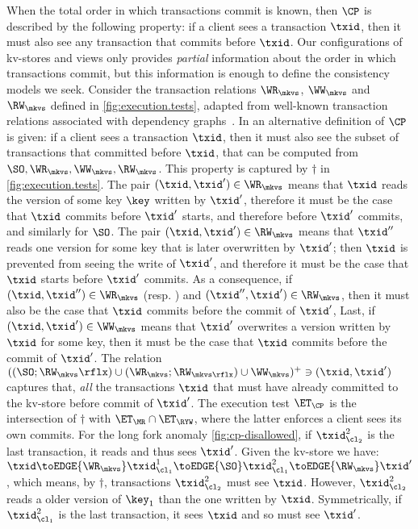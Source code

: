 \label{para:cp}
When the total order in which transactions commit is known, then 
$\CP$ is described by the following property: 
if a client sees a transaction $\txid$,
then it must also see any transaction that commits before $\txid$. 
Our configurations of kv-stores and views only provides {\em
  partial} information about the order in which transactions commit,
but this information is enough to define the consistency models we
seek. 
Consider the transaction relations $\WR_{\mkvs}$, $\WW_{\mkvs}$ and
$\RW_{\mkvs}$ defined in \ref{fig:execution.tests}, adapted from well-known
transaction relations associated with dependency graphs~\cite{adya-icde,adya}.
In \cite{laws} an alternative definition of $\CP$ is given: if a client sees a transaction $\txid$, 
then it must also see the subset of transactions that committed before $\txid$, that can 
be computed from $\SO, \WR_{\mkvs}, \WW_{\mkvs}, \RW_{\mkvs}$. This property is captured 
by $\dagger$ in \cref{fig:execution.tests}.
The pair $(\txid,\txid') \in \WR_\mkvs$ means that $\txid$ reads the version of some key $\key$ 
written by $\txid'$, therefore  it {must} be
the case that $\txid$ commits before $\txid'$ starts, and therefore before $\txid'$ commits,
and similarly for $\SO$.
The pair $(\txid, \txid') \in \RW_{\mkvs}$ means that $\txid''$ reads one version for some key that 
is later overwritten by $\txid'$; then $\txid$ is prevented from seeing the write of $\txid'$, 
and therefore it {must} be the case that $\txid$ starts before 
$\txid'$ commits. 
As a consequence, if 
$(\txid,\txid'') \in \WR_{\mkvs}$ (resp. \SO) and $(\txid'',\txid') \in \RW_\mkvs$, then it {must} also be the case that $\txid$ commits before the commit  of $\txid'$, 
Last, if $(\txid,\txid') \in \WW_\mkvs$ means that $\txid'$ overwrites a version written by $\txid$ for some 
key, then it {must} be
the case that $\txid$ commits before the commit of $\txid'$.
The relation $((\SO ; \RW_{\mkvs}\rflx) \cup (\WR_{\mkvs} ; \RW_{\mkvs\rflx}) \cup \WW_\mkvs )^{+} \ni (\txid, \txid')$
captures that, {\em all} the transactions $\txid$ that {must} have already committed to the kv-store before commit of \( \txid' \).
The execution test $\ET_{\CP}$ is the intersection of $\dagger$ with $\ET_\MR \cap \ET_\RYW$,
where the latter enforces a client sees its own commits.
For the long fork anomaly \cref{fig:cp-disallowed},
if \( \txid_{\cl_2}^2\) is the last transaction, it reads and thus sees \( \txid' \).
Given the kv-store we have:
\(
\txid \toEDGE{\WR_\mkvs} \txid^1_{\cl_1} \toEDGE{\SO} \txid^2_{\cl_1} \toEDGE{\RW_\mkvs} \txid'
\),
which means, by \( \dagger \), transactions \( \txid_{\cl_2}^2 \) must see \( \txid \).
However, \(  \txid_{\cl_2}^2 \) reads a older version of \( \key_1 \) than the one written by \( \txid \).
Symmetrically,
if \( \txid_{\cl_1}^2\) is the last transaction, it sees \( \txid \) and so must see \( \txid' \).


